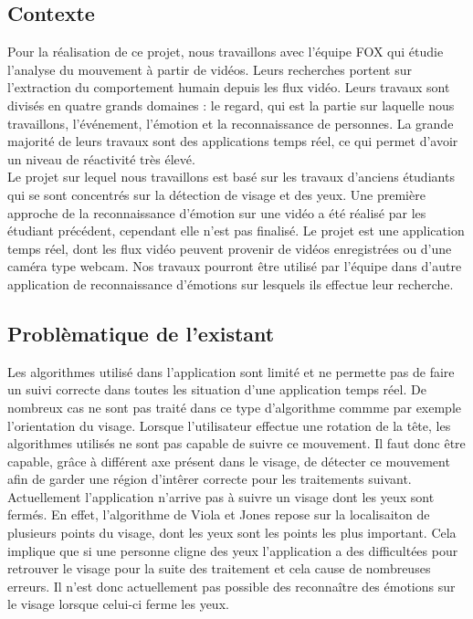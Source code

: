 \subsection{Contexte}
Pour la réalisation de ce projet, nous travaillons avec l'équipe FOX qui étudie
l'analyse du mouvement à partir de vidéos. Leurs recherches portent
sur l'extraction du comportement humain depuis les flux vidéo.  Leurs travaux sont
divisés en quatre grands domaines : le regard, qui est la partie sur laquelle nous travaillons, l'événement, l'émotion et la
reconnaissance de personnes. La grande majorité de leurs travaux sont
des applications temps réel, ce qui permet d'avoir un niveau de réactivité très élevé.\\ 

Le projet sur lequel nous travaillons est basé sur les travaux d'anciens étudiants qui se sont concentrés sur la
détection de visage et des yeux. Une première approche de la reconnaissance d'émotion sur une vidéo a été 
réalisé par les étudiant précédent, cependant elle n'est pas finalisé. Le projet est une application temps réel, dont les flux vidéo peuvent 
provenir de vidéos enregistrées ou d'une caméra type webcam. Nos travaux pourront être utilisé par
l'équipe dans d'autre application de reconnaissance d'émotions sur lesquels ils effectue leur recherche.\\

\subsection{Problèmatique de l'existant}
Les algorithmes utilisé dans l'application sont limité et ne permette pas de faire un suivi correcte
dans toutes les situation d'une application temps réel. De nombreux cas ne sont
pas traité dans ce type d'algorithme commme par exemple l'orientation du visage. Lorsque
l'utilisateur effectue une rotation de la tête, les algorithmes utilisés ne sont pas capable
de suivre ce mouvement. Il faut donc être capable, grâce à différent axe présent dans le visage, de détecter
ce mouvement afin de garder une région d'intêrer correcte pour les traitements suivant.\\

Actuellement l'application n'arrive pas à suivre un visage dont les yeux sont fermés. En effet,
l'algorithme de Viola et Jones repose sur la localisaiton de plusieurs points du visage, dont 
les yeux sont les points les plus important. Cela implique que si une personne cligne des yeux
l'application a des difficultées pour retrouver le visage pour la suite des traitement et cela 
cause de nombreuses erreurs. Il n'est donc actuellement pas possible des reconnaître des émotions
sur le visage lorsque celui-ci ferme les yeux.\\

